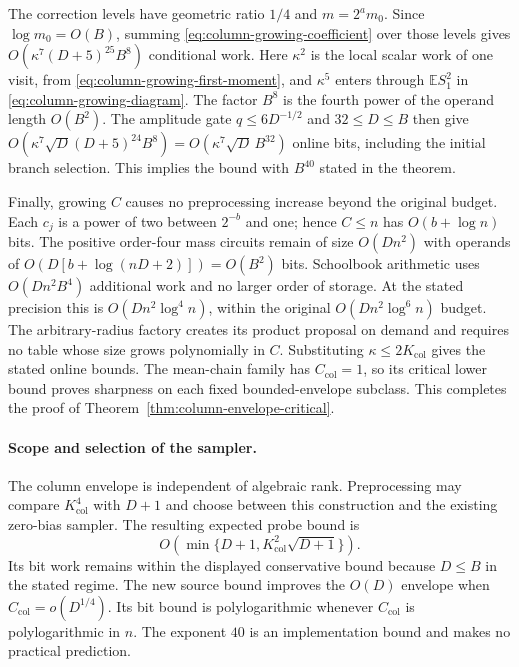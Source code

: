 The correction levels have geometric ratio $1/4$ and
$m=2^am_0$.  Since $\log m_0=O(B)$, summing
\eqref{eq:column-growing-coefficient} over those levels gives
$O(\kappa^7(D+5)^{25}B^8)$ conditional work.  Here $\kappa^2$ is
the local scalar work of one visit, from
\eqref{eq:column-growing-first-moment}, and $\kappa^5$ enters
through $\mathbb E S_1^2$ in \eqref{eq:column-growing-diagram}.
The factor $B^8$ is the fourth power of the operand length $O(B^2)$.
The amplitude gate $q\le6D^{-1/2}$ and $32\le D\le B$ then give
$O(\kappa^7\sqrt D(D+5)^{24}B^8)=O(\kappa^7\sqrt D\,B^{32})$
online bits, including the initial branch selection.  This implies
the bound with $B^{40}$ stated in the theorem.

Finally, growing $C$ causes no preprocessing increase beyond the
original budget.  Each $c_j$ is a power of two between $2^{-b}$
and one; hence $C\le n$ has $O(b+\log n)$ bits.  The positive
order-four mass circuits remain of size $O(Dn^2)$ with operands
of $O(D[b+\log(nD+2)])=O(B^2)$ bits.  Schoolbook arithmetic uses
$O(Dn^2B^4)$ additional work and no larger order of storage.
At the stated precision this is $O(Dn^2\log^4n)$, within the
original $O(Dn^2\log^6n)$ budget.  The arbitrary-radius factory
creates its product proposal on demand and requires no table whose
size grows polynomially in $C$.  Substituting
$\kappa\le2K_{\mathrm{col}}$ gives the stated online bounds.
The mean-chain family has $C_{\mathrm{col}}=1$, so its critical
lower bound proves sharpness on each fixed bounded-envelope subclass.
This completes the proof of
Theorem~\ref{thm:column-envelope-critical}.

\paragraph{Scope and selection of the sampler.}
The column envelope is independent of algebraic rank.
Preprocessing may compare $K_{\mathrm{col}}^4$ with $D+1$ and
choose between this construction and the existing zero-bias sampler.
The resulting expected probe bound is
\[
 O\!\left(\min\{D+1,K_{\mathrm{col}}^2\sqrt{D+1}\}\right).
\]
Its bit work remains within the displayed conservative bound because
$D\le B$ in the stated regime.  The new source bound improves the
$O(D)$ envelope when $C_{\mathrm{col}}=o(D^{1/4})$.
Its bit bound is polylogarithmic whenever $C_{\mathrm{col}}$ is
polylogarithmic in $n$.  The exponent $40$ is an implementation
bound and makes no practical prediction.
